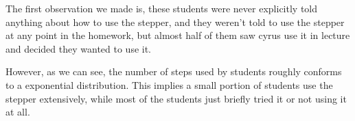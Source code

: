 The first observation we made is, these students were never explicitly
told anything about how to use the stepper, and they weren't told to
use the stepper at any point in the homework, but almost half of them
saw cyrus use it in lecture and decided they wanted to use it.

However, as we can see, the number of steps used by students roughly
conforms to a exponential distribution. This implies a small portion
of students use the stepper extensively, while most of the students
just briefly tried it or not using it at all.

